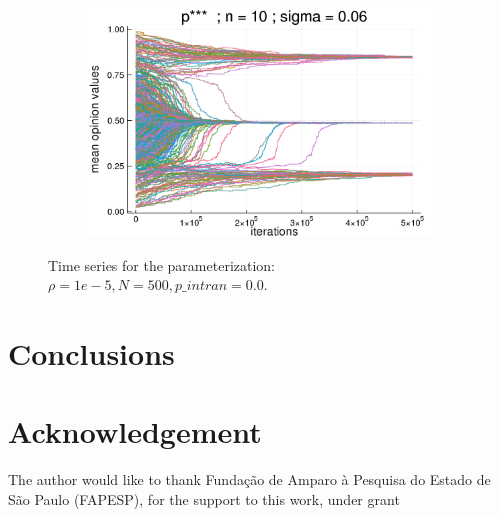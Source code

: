 \documentclass{article}
\begin{document}
\begin{figure}[H]
\begin{subfigure}[b]{0.49\textwidth}
        \includegraphics[width=\textwidth]{img/compare-ps/Poodlcalculatep***n10-rho10e-5-sigma006-00intrans.png}
      \end{subfigure}
      \caption{Time series for the parameterization: \(\rho = 1e-5, N = 500,
        p\_intran = 0.0 \).}
  \label{fig:tseries6}
    \end{figure}


  \section{Conclusions}






\section{Acknowledgement}
The author would like to thank Funda\c{c}\~ao de Amparo \`a Pesquisa do Estado de S\~ao Paulo (FAPESP), for the support to this work, under grant %



\end{document}
